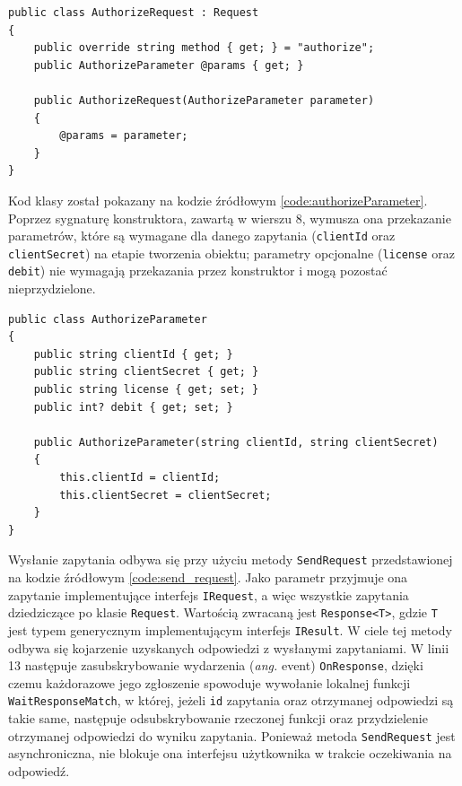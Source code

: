 \documentclass[skorowidz,skroty]{dyplomWEZUT}
\begin{document}
\begin{lstlisting}[language={[Sharp]C}]
public class AuthorizeRequest : Request
{
    public override string method { get; } = "authorize";
    public AuthorizeParameter @params { get; }

    public AuthorizeRequest(AuthorizeParameter parameter)
    {
        @params = parameter;
    }
}
\end{lstlisting}

Kod klasy  został pokazany na kodzie źródłowym \ref{code:authorizeParameter}. Poprzez sygnaturę konstruktora, zawartą w wierszu 8, wymusza ona przekazanie parametrów, które są wymagane dla danego zapytania (\lstinline[language={[Sharp]C}]{clientId} oraz \lstinline[language={[Sharp]C}]{clientSecret}) na etapie tworzenia obiektu; parametry opcjonalne (\lstinline[language={[Sharp]C}]{license} oraz \lstinline[language={[Sharp]C}]{debit}) nie wymagają przekazania przez konstruktor i mogą pozostać nieprzydzielone.

\begin{lstlisting}[language={[Sharp]C}]
public class AuthorizeParameter
{
    public string clientId { get; }
    public string clientSecret { get; }
    public string license { get; set; }
    public int? debit { get; set; }

    public AuthorizeParameter(string clientId, string clientSecret)
    {
        this.clientId = clientId;
        this.clientSecret = clientSecret;
    }
}
\end{lstlisting}

Wysłanie zapytania odbywa się przy użyciu metody \lstinline[language={[Sharp]C}]{SendRequest} przedstawionej na kodzie źródłowym \ref{code:send_request}. Jako parametr przyjmuje ona zapytanie implementujące interfejs \lstinline[language={[Sharp]C}]{IRequest}, a więc wszystkie zapytania dziedziczące po klasie \lstinline[language={[Sharp]C}]{Request}. Wartością zwracaną jest \lstinline[language={[Sharp]C}]{Response<T>}, gdzie \lstinline[language={[Sharp]C}]{T} jest typem generycznym implementującym interfejs \lstinline[language={[Sharp]C}]{IResult}. W ciele tej metody odbywa się kojarzenie uzyskanych odpowiedzi z wysłanymi zapytaniami. W linii 13 następuje zasubskrybowanie wydarzenia (\textit{ang.} event) \lstinline[language={[Sharp]C}]{OnResponse}, dzięki czemu każdorazowe jego zgłoszenie spowoduje wywołanie lokalnej funkcji \lstinline[language={[Sharp]C}]{WaitResponseMatch}, w której, jeżeli \lstinline[language={[Sharp]C}]{id} zapytania oraz otrzymanej odpowiedzi są takie same, następuje odsubskrybowanie rzeczonej funkcji oraz przydzielenie otrzymanej odpowiedzi do wyniku zapytania. Ponieważ metoda \lstinline[language={[Sharp]C}]{SendRequest} jest asynchroniczna, nie blokuje ona interfejsu użytkownika w trakcie oczekiwania na odpowiedź.
\end{document}
